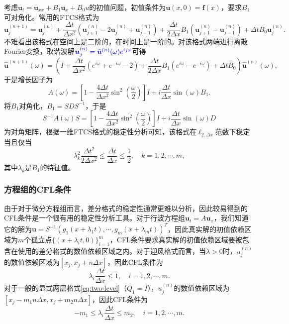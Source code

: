 \documentclass[a4paper,10pt]{ctexart}
\begin{document}
\begin{example}
    考虑$ \bm{u}_t = \bm{u}_{xx} + B_1 \bm{u}_x + B_0 u $的初值问题，初值条件为$ \bm{u}(x,0) = \bm{f}(x) $，要求$ B_1 $可对角化。常用的FTCS格式为
    \begin{equation}
        \bm{u}^{(n+1)}_j = \bm{u}^{(n)}_j + \frac{\Delta t}{\Delta x^2}(\bm{u}^{(n)}_{j+1}-2\bm{u}^{(n)}_j+\bm{u}^{(n)}_{j-1}) + \frac{\Delta t}{2\Delta x}B_1(\bm{u}^{(n)}_{j+1}-\bm{u}^{(n)}_{j-1}) + \Delta t B_0 \bm{u}^{(n)}_j.
    \end{equation}
    不难看出该格式在空间上是二阶的，在时间上是一阶的。对该格式两端进行离散Fourier变换，取谐波解$ \textcolor{blue}{\bm{u}^{(n)}_j = \hat{\bm{u}}^{(n)}(\omega)e^{i j\omega}} $可得
    \begin{equation}
        \hat{\bm{u}}^{(n+1)}(\omega) = \left( I + \frac{\Delta t}{\Delta x^2}(e^{i\omega}+e^{-i\omega}-2) + \frac{\Delta t}{2\Delta x}B_1(e^{i\omega}-e^{-i\omega}) + \Delta t B_0 \right) \hat{\bm{u}}^{(n)}(\omega),
    \end{equation}
    于是增长因子为
    \begin{equation}
        A(\omega) = [1-\frac{4\Delta t}{\Delta x^2}\sin^2(\frac{\omega}{2})]I + i\frac{\Delta t}{\Delta x}\sin(\omega)B_1.
    \end{equation}
    将$ B_1 $对角化，$ B_1 = SDS^{-1} $，于是
    \begin{equation}
        S^{-1}A(\omega)S = [1-\frac{4\Delta t}{\Delta x^2}\sin^2(\frac{\omega}{2})]I + i\frac{\Delta t}{\Delta x}\sin(\omega)D
    \end{equation}
    为对角矩阵，根据一维FTCS格式的稳定性分析可知，该格式在$ \ell_{2,\Delta x} $范数下稳定当且仅当
    \begin{equation}
        \lambda_k^2\frac{\Delta t^2}{2\Delta x^2} \leqslant \frac{\Delta t}{\Delta x} \leqslant \frac{1}{2},\quad k=1,2,\cdots ,m,
    \end{equation}
    其中$ \lambda_k $是$ B_1 $的特征值。
\end{example}

\subsubsection{方程组的CFL条件}
由于对于微分方程组而言，差分格式的稳定性通常更难以分析，因此较易得到的CFL条件是一个很有用的稳定性分析工具。对于行波方程组$ \bm{u}_t = A \bm{u}_x $，我们知道它的解为$ \bm{u} = S^{-1}(g_1(x+\lambda_1t),\cdots ,g_m(x+\lambda_m t))^T $，因此真实解的初值依赖区域为$ m $个孤立点$ \{(x+\lambda_i t,0)\}_{i=1}^m $，CFL条件要求真实解的初值依赖区域要被包含在使用的差分格式的数值依赖区域之内。对于迎风格式而言，当$ \lambda>0 $时，$ u^{(n)}_j $的数值依赖区域为$ [x_j, x_j+n \Delta x] $，因此CFL条件为
\[
    \lambda_i \frac{\Delta t}{\Delta x}\leqslant 1,\quad i=1,2,\cdots ,m.
\]
对于一般的显式两层格式\eqref{eq:two-level}（$ Q_1=I $），$ u^{(n)}_j $的数值依赖区域为$ [x_j-m_1n \Delta x, x_j + m_2n \Delta x] $，因此CFL条件为
\[
    -m_1 \leqslant  \lambda_i \frac{\Delta t}{\Delta x}\leqslant m_2,\quad i=1,2,\cdots ,m.
\]
\end{document}
